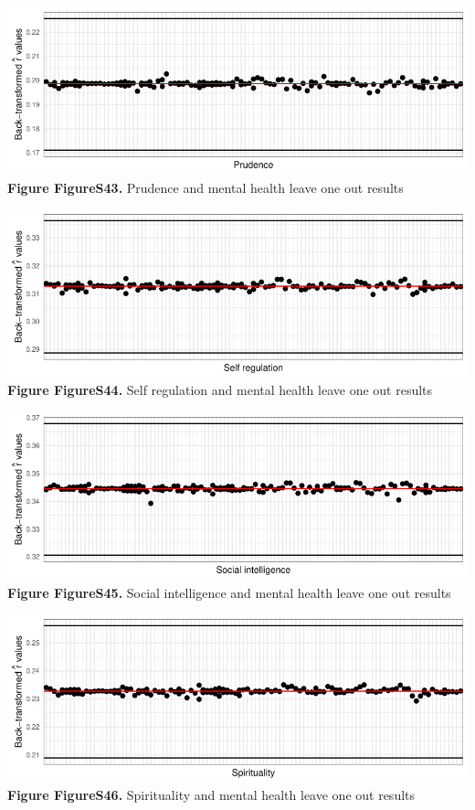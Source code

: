 \documentclass[
  letterpaper,
  DIV=11,
  numbers=noendperiod]{scrartcl}
\begin{document}
\includegraphics{SupplementaryResults_files/figure-pdf/unnamed-chunk-12-19.pdf}\textbf{Figure
FigureS43.} Prudence and mental health leave one out results

\includegraphics{SupplementaryResults_files/figure-pdf/unnamed-chunk-12-20.pdf}\textbf{Figure
FigureS44.} Self regulation and mental health leave one out results

\includegraphics{SupplementaryResults_files/figure-pdf/unnamed-chunk-12-21.pdf}\textbf{Figure
FigureS45.} Social intelligence and mental health leave one out results

\includegraphics{SupplementaryResults_files/figure-pdf/unnamed-chunk-12-22.pdf}\textbf{Figure
FigureS46.} Spirituality and mental health leave one out results
\end{document}
